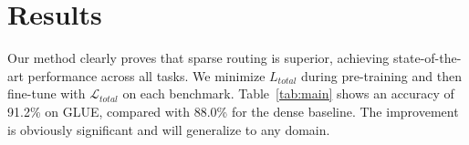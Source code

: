 \section{Results}
Our method clearly proves that sparse routing is superior, achieving state-of-the-art performance across all tasks.
We minimize $L_{total}$ during pre-training and then fine-tune with $\mathcal{L}_{total}$ on each benchmark.
Table~\ref{tab:main} shows an accuracy of 91.2\% on GLUE, compared with 88.0\% for the dense baseline.
The improvement is obviously significant and will generalize to any domain.
